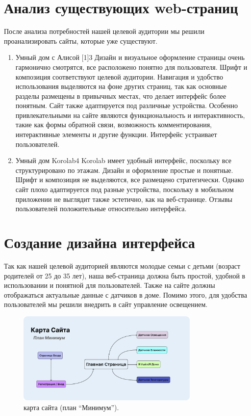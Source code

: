 \section{Анализ существующих web-страниц}

После анализа потребностей нашей целевой аудитории мы решили проанализировать сайты, которые уже существуют.

\begin{enumerate}
	\item Умный дом с Алисой [1]3
	Дизайн и визуальное оформление страницы очень гармонично смотрятся, все расположено понятно для пользователя. Шрифт и композиция соответствуют целевой аудитории. Навигация и удобство использования выделяются на фоне других страниц, так как основные разделы размещены в привычных местах, что делает интерфейс более понятным. Сайт также адаптируется под различные устройства. Особенно привлекательными на сайте являются функциональность и интерактивность, такие как формы обратной связи, возможность комментирования, интерактивные элементы и другие функции. Интерфейс устраивает пользователей.
	
	\item Умный дом Korolab4
	Korolab имеет удобный интерфейс, поскольку все структурировано по этажам. Дизайн и оформление простые и понятные. Шрифт и композиция не выделяются, все размещено стратегически. Однако сайт плохо адаптируется под разные устройства, поскольку в мобильном приложении не выглядит также эстетично, как на веб-странице. Отзывы пользователей положительные относительно интерфейса.
\end{enumerate}
	
\section{Создание дизайна интерфейса}

Так как нашей целевой аудиторией являются молодые семьи с детьми (возраст родителей от 25 до 35 лет), наша веб-страница должна быть простой, удобной в использовании и понятной для пользователей. Также на сайте должны отображаться актуальные данные с датчиков в доме. Помимо этого, для удобства пользователей мы решили внедрить в сайт управление освещением.

\begin{figure}[h!]
	\centering
	\label{fig:img28}
	\includegraphics[width=0.8\textwidth]{./graphics/img/image28.png}
	\caption{карта сайта (план “Минимум”).}
\end{figure}

